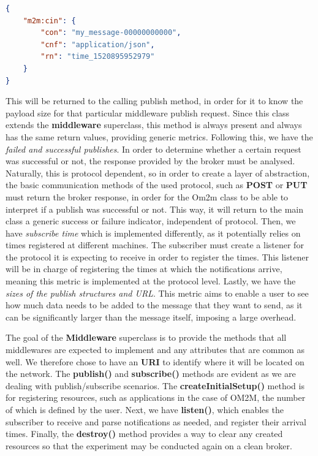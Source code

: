 \documentclass[conference]{IEEEtran}
\begin{document}
\begin{lstlisting}[linewidth=\columnwidth, caption=JSON payload for content instance creation, captionpos=b, label=lst:application_creation, language=json]
{
	"m2m:cin": {
		"con": "my_message-00000000000",
		"cnf": "application/json",
		"rn": "time_1520895952979"
	}
}
\end{lstlisting}
This will be returned to the calling publish method, in order for it to know the payload size for that particular middleware publish request. Since this class extends the \textbf{middleware} superclass, this method is always present and always has the same return values, providing generic metrics.
Following this, we have the \textit{failed and successful publishes}. In order to determine whether a certain request was successful or not, the response provided by the broker must be analysed. Naturally, this is protocol dependent, so in order to create a layer of abstraction, the basic communication methods of the used protocol, such as \textbf{POST} or \textbf{PUT} must return the broker response, in order for the Om2m class to be able to interpret if a publish was successful or not. This way, it will return to the main class a generic success or failure indicator, independent of protocol. 
Then, we have \textit{subscribe time} which is implemented differently, as it potentially relies on times registered at different machines. The subscriber must create a listener for the protocol it is expecting to receive in order to register the times. This listener will be in charge of registering the times at which the notifications arrive, meaning this metric is implemented at the protocol level. Lastly, we have the \textit{sizes of the publish structures and URL\@}. This metric aims to enable a user to see how much data needs to be added to the message that they want to send, as it can be significantly larger than the message itself, imposing a large overhead.

The goal of the \textbf{Middleware} superclass is to provide the methods that all middlewares are expected to implement and any attributes that are common as well. We therefore chose to have an \textbf{URI} to identify where it will be located on the network. The \textbf{publish()} and \textbf{subscribe()} methods are evident as we are dealing with publish/subscribe scenarios. The \textbf{createInitialSetup()} method is for registering resources, such as applications in the case of OM2M, the number of which is defined by the user. Next, we have \textbf{listen()}, which enables the subscriber to receive and parse notifications as needed, and register their arrival times. Finally, the \textbf{destroy()} method provides a way to clear any created resources so that the experiment may be conducted again on a clean broker. 
\end{document}
